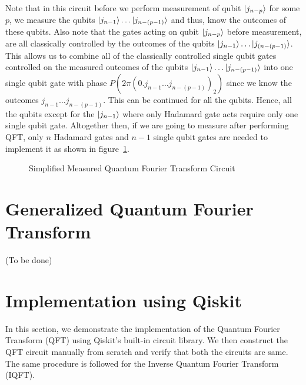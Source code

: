 \begin{remark}
Note that in this circuit before we perform measurement of qubit $\ket{j_{n-p}}$ for some $p$, we measure the qubits $\ket{j_{n-1}}\ldots \ket{j_{n-(p-1)}}$ and thus, know the outcomes of these qubits. Also note that the gates acting on qubit $\ket{j_{n-p}}$ before measurement, are all classically controlled by the outcomes of the qubits $\ket{j_{n-1}}\ldots \ket{j_{(n-(p-1)}}$. This allows us to combine all of the classically controlled single qubit gates controlled on the measured outcomes of the qubits $\ket{j_{n-1}}\ldots\ket{j_{n-(p-1)}}$ into one single qubit gate with phase $P(2\pi (0.j_{n-1}\ldots j_{n-(p-1)})_2)$ since we know the outcomes $j_{n-1}\ldots j_{n-(p-1)}$. This can be continued for all the qubits. Hence, all the qubits except for the $\ket{j_{n-1}}$ where only Hadamard gate acts require only one single qubit gate. Altogether then,  if we are going to measure after performing QFT, only $n$ Hadamard gates and $n-1$ single qubit gates are needed to implement it as shown in figure~\ref{fig:simp_measqft}.
\begin{figure}[ht]
    \centering
    \caption{Simplified Measured Quantum Fourier Transform Circuit}
    \label{fig:simp_measqft}
\end{figure}
\end{remark}

\section{Generalized Quantum Fourier Transform}
(To be done)

\section{Implementation using Qiskit}
In this section, we demonstrate the implementation of the Quantum Fourier Transform (QFT) using Qiskit's built-in circuit library. We then construct the QFT circuit manually from scratch and verify that both the circuits are same. The same procedure is followed for the Inverse Quantum Fourier Transform (IQFT).

